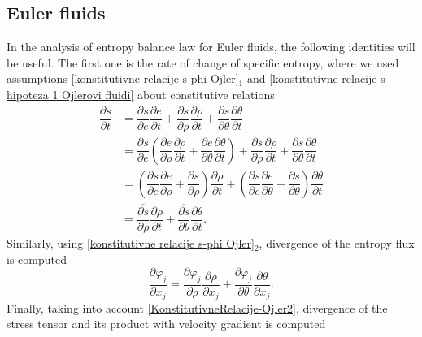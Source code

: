 \documentclass[a4paper,fleqn]{cas-sc}
\theoremstyle{definition}
\begin{document}
\subsection{Euler fluids} 

In the analysis of entropy balance law for Euler fluids, the following identities will be useful. The first one is the rate of change of specific entropy, where we used assumptions \eqref{konstitutivne relacije s-phi Ojler}$_1$ and \eqref{konstitutivne relacije s hipoteza 1 Ojlerovi fluidi} about constitutive relations
\begin{align} \label{App:specificna entropija Ojler}
	\dfrac{\partial s}{\partial t}&=\dfrac{\partial s}{\partial e}\dfrac{\partial e}{\partial t}+\dfrac{\partial s}{\partial\rho}\dfrac{\partial\rho}{\partial t}+\dfrac{\partial s}{\partial\theta}\dfrac{\partial\theta}{\partial t}
	\nonumber \\
	&=\dfrac{\partial s}{\partial e}\left(\dfrac{\partial e}{\partial\rho}\dfrac{\partial\rho}{\partial t}+\dfrac{\partial e}{\partial\theta}\dfrac{\partial\theta}{\partial t}\right)+\dfrac{\partial s}{\partial\rho}\dfrac{\partial\rho}{\partial t}+\dfrac{\partial s}{\partial\theta}\dfrac{\partial\theta}{\partial t} 
	\\
	&=\left(\dfrac{\partial s}{\partial e}\dfrac{\partial e}{\partial\rho}+\dfrac{\partial s}{\partial\rho}\right)\dfrac{\partial\rho}{\partial t}+\left(\dfrac{\partial s}{\partial e}\dfrac{\partial e}{\partial\theta}+\dfrac{\partial s}{\partial\theta}\right)\dfrac{\partial\theta}{\partial t} 
	\nonumber \\
	&=\overline{\dfrac{\partial s}{\partial\rho}}\dfrac{\partial\rho}{\partial t}+\overline{\dfrac{\partial s}{\partial\theta}}\dfrac{\partial\theta}{\partial t}. 
	\nonumber 
\end{align}
Similarly, using \eqref{konstitutivne relacije s-phi Ojler}$_2$, divergence of the entropy flux is computed 
\begin{equation} \label{App:protok entropije Ojlerovi fluidi}
	\dfrac{\partial\varphi_j}{\partial x_j} 
	= \dfrac{\partial\varphi_j}{\partial\rho} \dfrac{\partial\rho}{\partial x_j} 
	+ \dfrac{\partial\varphi_j}{\partial\theta}\dfrac{\partial\theta}{\partial x_j}. 
\end{equation} 
Finally, taking into account \eqref{KonstitutivneRelacije-Ojler2}, divergence of the stress tensor and its product with velocity gradient is computed 
\end{document}
